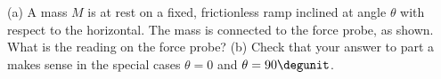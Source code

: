 (a) A mass $M$ is at rest on a fixed, frictionless ramp inclined at angle
$\theta$ with respect to the horizontal. The mass is connected to the
force probe, as shown. What is the reading on the force probe?\answercheck\hwendpart
%
(b) Check that your answer to part a makes sense in the special cases
$\theta=0$ and $\theta=90\degunit$.
